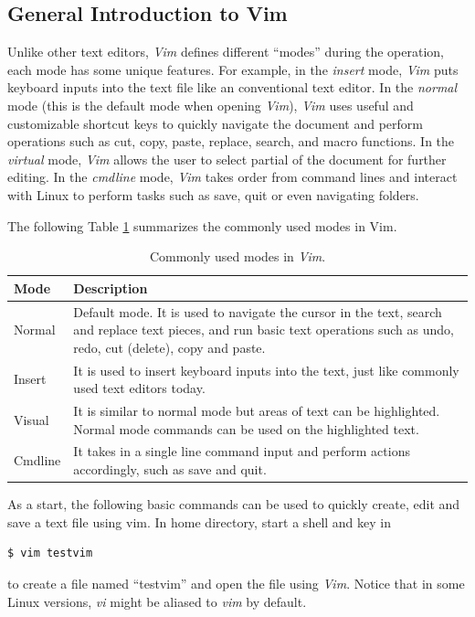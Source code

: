 \subsection{General Introduction to Vim} \label{ch3:subsec:vimgeneralintro}

Unlike other text editors, \textit{Vim} defines different ``modes'' during the operation, each mode has some unique features. For example, in the \textit{insert} mode, \textit{Vim} puts keyboard inputs into the text file like an conventional text editor. In the \textit{normal} mode (this is the default mode when opening \textit{Vim}), \textit{Vim} uses useful and customizable shortcut keys to quickly navigate the document and perform operations such as cut, copy, paste, replace, search, and macro functions. In the \textit{virtual} mode, \textit{Vim} allows the user to select partial of the document for further editing. In the \textit{cmdline} mode, \textit{Vim} takes order from command lines and interact with Linux to perform tasks such as save, quit or even navigating folders.

The following Table \ref{ch3tab:vimmodes} summarizes the commonly used modes in Vim.
\begin{table}
  \centering \caption{Commonly used modes in \textit{Vim}.}\label{ch3tab:vimmodes}
  \begin{tabularx}{\textwidth}{lX}
    \hline
    Mode & Description \\ \hline
    Normal & Default mode. It is used to navigate the cursor in the text, search and replace text pieces, and run basic text operations such as undo, redo, cut (delete), copy and paste. \\ \hdashline
    Insert & It is used to insert keyboard inputs into the text, just like commonly used text editors today. \\ \hdashline
    Visual & It is similar to normal mode but areas of text can be highlighted. Normal mode commands can be used on the highlighted text. \\ \hdashline
    Cmdline & It takes in a single line command input and perform actions accordingly, such as save and quit. \\
    \hline
  \end{tabularx}
\end{table}

As a start, the following basic commands can be used to quickly create, edit and save a text file using vim. In home directory, start a shell and key in
\begin{verbatim}
$ vim testvim
\end{verbatim}
to create a file named ``testvim'' and open the file using \textit{Vim}. Notice that in some Linux versions, \textit{vi} might be aliased to \textit{vim} by default.

